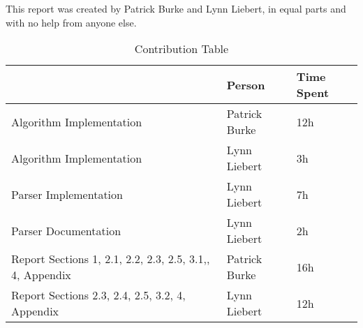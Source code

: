 This report was created by Patrick Burke and Lynn Liebert, in equal parts and with no help from anyone else.

\vspace{2cm}
\vspace{2cm}

\vspace{7cm}

\begin{table}[H]
\centering
\caption*{Contribution Table}
\begin{tabular}{|p{5cm}|l|l|}
\hline
                         & Person        & Time Spent \\ \hline
Algorithm Implementation & Patrick Burke & 12h        \\ \hline
Algorithm Implementation & Lynn Liebert  & 3h         \\ \hline
Parser Implementation    & Lynn Liebert  & 7h         \\ \hline
Parser Documentation     & Lynn Liebert  & 2h         \\ \hline
Report Sections 1, 2.1,
2.2, 2.3, 2.5, 3.1,, 4,
Appendix                 & Patrick Burke & 16h        \\ \hline
Report Sections 2.3,
2.4, 2.5, 3.2, 4, Appendix    & Lynn Liebert  & 12h        \\ \hline

\end{tabular}
\end{table}
